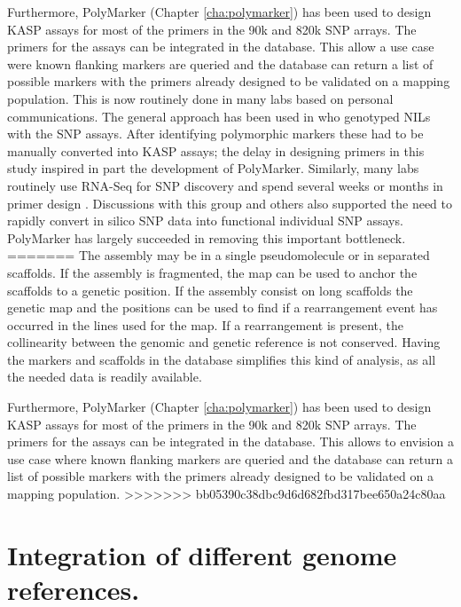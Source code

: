Furthermore, PolyMarker (Chapter \ref{cha:polymarker}) has been used to design KASP assays for most of the primers in the 90k \citep{Wang2014} and 820k \citet{Winfield2016} SNP arrays. 
The primers for the assays can be integrated in the database. 
This allow a use case were known flanking markers are queried and the database can return a list of possible markers with the primers already designed to be validated on a mapping population. 
This is now routinely done in many labs based on personal communications. 
The general approach has been used in \citet{Simmonds2014} who genotyped NILs with the SNP assays. 
After identifying polymorphic markers these had to be manually converted into KASP assays; the delay in designing primers in this study inspired in part the development of PolyMarker. 
Similarly, many labs routinely use RNA-Seq for SNP discovery and spend several weeks or months in primer design \citep{Shatalina2013}. 
Discussions with this group and others also supported the need to rapidly convert in silico SNP data into functional individual SNP assays. 
PolyMarker has largely succeeded in removing this important bottleneck. 
=======
The assembly may be in a single pseudomolecule or in separated scaffolds. 
If the assembly is fragmented, the  map can be used to anchor the scaffolds to a genetic position. 
If the assembly consist on long scaffolds the genetic map and the positions can be used to find if a rearrangement event has occurred in the lines used for the map. 
If a rearrangement is present, the collinearity between the genomic and genetic reference is not conserved. 
Having the markers and scaffolds in the database simplifies this kind of analysis, as all the needed data is readily available. 

Furthermore, PolyMarker (Chapter \ref{cha:polymarker}) has been used to design KASP assays for most of the primers in the 90k \citep{Wang2014} and 820k \citet{Winfield2016} SNP arrays. 
The primers for the assays can be integrated in the database. 
This allows to envision a use case where known flanking markers are queried and the database can return a list of possible markers with the primers already designed to be validated on a mapping population. 
>>>>>>> bb05390c38dbc9d6d682fbd317bee650a24c80aa

\section{Integration of different genome references. }

